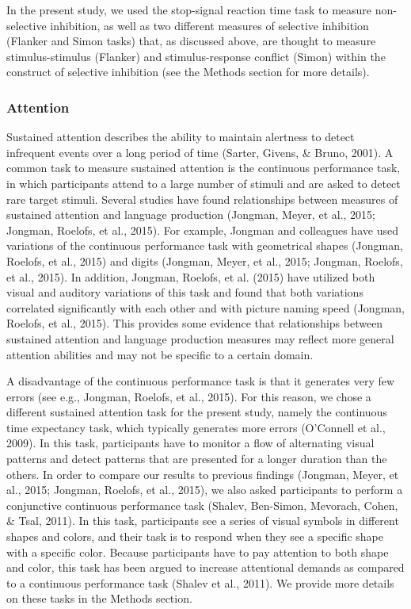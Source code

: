 \documentclass[
  man,floatsintext]{apa6}
\begin{document}
In the present study, we used the stop-signal reaction time task to measure non-selective inhibition, as well as two different measures of selective inhibition (Flanker and Simon tasks) that, as discussed above, are thought to measure stimulus-stimulus (Flanker) and stimulus-response conflict (Simon) within the construct of selective inhibition (see the Methods section for more details).

\hypertarget{attention}{%
\subsubsection{Attention}\label{attention}}

Sustained attention describes the ability to maintain alertness to detect infrequent events over a long period of time (Sarter, Givens, \& Bruno, 2001). A common task to measure sustained attention is the continuous performance task, in which participants attend to a large number of stimuli and are asked to detect rare target stimuli. Several studies have found relationships between measures of sustained attention and language production (Jongman, Meyer, et al., 2015; Jongman, Roelofs, et al., 2015). For example, Jongman and colleagues have used variations of the continuous performance task with geometrical shapes (Jongman, Roelofs, et al., 2015) and digits (Jongman, Meyer, et al., 2015; Jongman, Roelofs, et al., 2015). In addition, Jongman, Roelofs, et al. (2015) have utilized both visual and auditory variations of this task and found that both variations correlated significantly with each other and with picture naming speed (Jongman, Roelofs, et al., 2015). This provides some evidence that relationships between sustained attention and language production measures may reflect more general attention abilities and may not be specific to a certain domain.

A disadvantage of the continuous performance task is that it generates very few errors (see e.g., Jongman, Roelofs, et al., 2015). For this reason, we chose a different sustained attention task for the present study, namely the continuous time expectancy task, which typically generates more errors (O'Connell et al., 2009). In this task, participants have to monitor a flow of alternating visual patterns and detect patterns that are presented for a longer duration than the others. In order to compare our results to previous findings (Jongman, Meyer, et al., 2015; Jongman, Roelofs, et al., 2015), we also asked participants to perform a conjunctive continuous performance task (Shalev, Ben-Simon, Mevorach, Cohen, \& Tsal, 2011). In this task, participants see a series of visual symbols in different shapes and colors, and their task is to respond when they see a specific shape with a specific color. Because participants have to pay attention to both shape and color, this task has been argued to increase attentional demands as compared to a continuous performance task (Shalev et al., 2011). We provide more details on these tasks in the Methods section.
\end{document}
